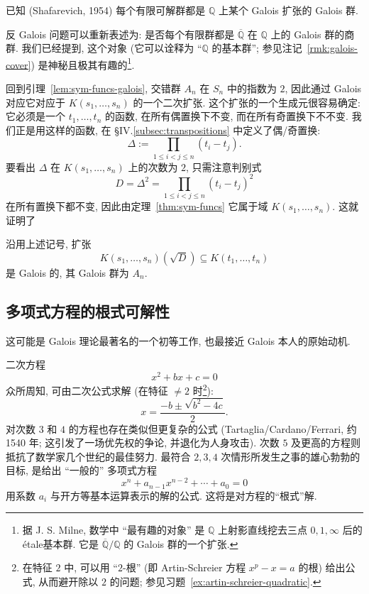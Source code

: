 已知 (Shafarevich, 1954) 每个有限可解群都是 $\mathbb{Q}$ 上某个 Galois 扩张的 Galois 群.

反 Galois 问题可以重新表述为: 是否每个有限群都是 $\overline{\mathbb{Q}}$ 在 $\mathbb{Q}$ 上的 Galois 群的商群. 我们已经提到, 这个对象 (它可以诠释为 ``$\mathbb{Q}$ 的基本群''; 参见注记~\ref{rmk:galois-cover}) 是神秘且极其有趣的\footnote{据 J. S. Milne, 数学中 ``最有趣的对象'' 是 $\mathbb{Q}$ 上射影直线挖去三点 $0,1,\infty$ 后的étale基本群. 它是 $\overline{\mathbb{Q}}/\mathbb{Q}$ 的 Galois 群的一个扩张.}.

回到引理~\ref{lem:sym-funcs-galois}, 交错群 $A_n$ 在 $S_n$ 中的指数为 $2$, 因此通过 Galois 对应它对应于 $K(s_1,\ldots,s_n)$ 的一个二次扩张. 这个扩张的一个生成元很容易确定: 它必须是一个 $t_1,\ldots,t_n$ 的函数, 在所有偶置换下不变, 而在所有奇置换下不不变. 我们正是用这样的函数, 在 §IV.\ref{subsec:transpositions} 中定义了偶/奇置换:
\[
\Delta:=\prod_{1\le i<j\le n}(t_i-t_j).
\]
要看出 $\Delta$ 在 $K(s_1,\ldots,s_n)$ 上的次数为 $2$, 只需注意判别式
\[
D=\Delta^2=\prod_{1\le i<j\le n}(t_i-t_j)^2
\]
在所有置换下都不变, 因此由定理~\ref{thm:sym-funcs} 它属于域 $K(s_1,\ldots,s_n)$. 这就证明了

\begin{corollary}\label{cor:sym-funcs-an}
沿用上述记号, 扩张
\[
K(s_1,\ldots,s_n)(\sqrt{D})\subseteq K(t_1,\ldots,t_n)
\]
是 Galois 的, 其 Galois 群为 $A_n$.
\end{corollary}

\subsection{多项式方程的根式可解性}
\label{subsec:radical-solvability}

这可能是 Galois 理论最著名的一个初等工作, 也最接近 Galois 本人的原始动机.

二次方程
\[
x^2+bx+c=0
\]
 众所周知, 可由二次公式求解 (在特征 $\neq 2$ 时\footnote{在特征 $2$ 中, 可以用 ``$2$-根'' (即 Artin-Schreier 方程 $x^p-x=a$ 的根) 给出公式, 从而避开除以 $2$ 的问题; 参见习题~\ref{ex:artin-schreier-quadratic}.}):
\[
x=\frac{-b\pm\sqrt{b^2-4c}}{2}.
\]
对次数 $3$ 和 $4$ 的方程也存在类似但更复杂的公式 (Tartaglia/Cardano/Ferrari, 约 1540 年; 这引发了一场优先权的争论, 并退化为人身攻击). 次数 $5$ 及更高的方程则抵抗了数学家几个世纪的最佳努力. 最符合 $2,3,4$ 次情形所发生之事的雄心勃勃的目标, 是给出 ``一般的'' 多项式方程
\[
x^n+a_{n-1}x^{n-2}+\cdots+a_0=0
\]
用系数 $a_i$ 与开方等基本运算表示的解的公式. 这将是对方程的``根式''解.


